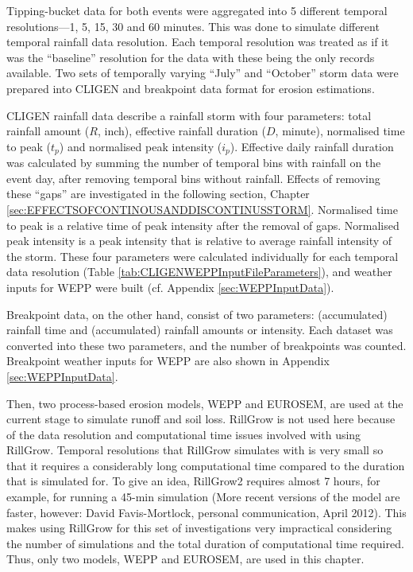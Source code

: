 Tipping-bucket data for both events were aggregated into 5 different temporal
resolutions---1, 5, 15, 30 and 60 minutes. This was done to simulate different
temporal rainfall data resolution. Each temporal resolution was treated as if it
was the
``baseline'' resolution for the data with these being the only records
available. Two
sets of temporally varying ``July'' and ``October'' storm data were prepared
into CLIGEN and breakpoint data format for erosion estimations.

CLIGEN rainfall data describe a rainfall storm with four parameters: total
rainfall amount ($R$, inch), effective rainfall duration ($D$, minute),
normalised time to peak ($t_p$) and normalised peak intensity ($i_p$). Effective
daily rainfall duration was calculated by summing the number of temporal bins
with rainfall on the event day, after removing temporal bins without rainfall.
Effects of removing these ``gaps'' are investigated in the following section,
Chapter \ref{sec:EFFECTSOFCONTINOUSANDDISCONTINUSSTORM}. Normalised time to
peak is a relative time of peak intensity after the removal of gaps.
Normalised peak intensity is a peak intensity that is relative to average
rainfall intensity of the storm. These four parameters were calculated
individually for each temporal data resolution (Table
\ref{tab:CLIGENWEPPInputFileParameters}), and weather inputs for WEPP were
built (cf. Appendix \ref{sec:WEPPInputData}).

Breakpoint data, on the other hand, consist of two parameters: (accumulated)
rainfall time and (accumulated) rainfall amounts or intensity. Each dataset was
converted into these two parameters, and the number of breakpoints was counted.
Breakpoint weather inputs for WEPP are also shown in Appendix
\ref{sec:WEPPInputData}.

Then, two process-based erosion models, WEPP and EUROSEM, are used at the
current stage to simulate runoff and soil loss. RillGrow is not used here
because of the data resolution and computational time issues involved
with using RillGrow. Temporal resolutions that RillGrow simulates with is very
small so that it requires a considerably long computational time compared to the
duration that is simulated for. To give an idea, RillGrow2 requires almost 7
hours, for example, for running a 45-min simulation (More recent versions of the
model are faster, however: David Favis-Mortlock, personal communication, April
2012). This makes using RillGrow for this set of investigations very impractical
considering the number of simulations and the total duration of computational
time required. Thus, only two models, WEPP and EUROSEM, are used in this
chapter.

